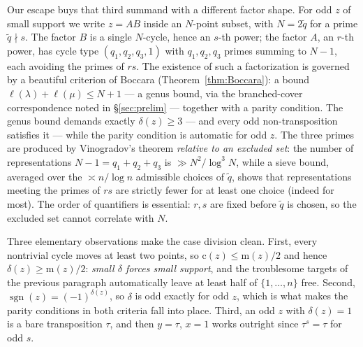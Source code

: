 \documentclass[11pt]{amsart}
\numberwithin{equation}{section}
\theoremstyle{remark}
\newcommand{\sgn}{\operatorname{sgn}}
\newcommand{\md}{\mathrm{m}}   %
\newcommand{\cy}{\mathrm{c}}   %
\begin{document}
Our escape buys that third summand with a different factor shape. For odd $z$ of
small support we write $z=AB$ inside an $N$-point subset, with $N=2\tilde q$ for
a prime $\tilde q\nmid s$. The factor $B$ is a single $N$-cycle, hence an
$s$-th power; the factor $A$, an $r$-th power, has cycle type $(q_1,q_2,q_3,1)$
with $q_1,q_2,q_3$ primes summing to $N-1$, each avoiding the primes of $rs$.
The existence of such a factorization is governed by a beautiful criterion of
Boccara (Theorem~\ref{thm:Boccara}): a bound
$\ell(\lambda)+\ell(\mu)\le N+1$ --- a genus bound, via the branched-cover
correspondence noted in \S\ref{sec:prelim} --- together with a parity condition. The genus bound
demands exactly $\delta(z)\ge 3$ --- and every odd non-transposition satisfies it
--- while the parity condition is automatic for odd $z$. The three primes are
produced by Vinogradov's theorem \emph{relative to an excluded set}: the number of
representations $N-1=q_1+q_2+q_3$ is $\gg N^2/\log^3N$, while a sieve bound,
averaged over the $\asymp n/\log n$ admissible choices of $\tilde q$, shows that
representations meeting the primes of $rs$ are strictly fewer for at least one
choice (indeed for most). The order of quantifiers is essential: $r,s$ are fixed
before $\tilde q$ is chosen, so the excluded set cannot correlate with $N$.

Three elementary observations make the case division clean. First, every
nontrivial cycle
moves at least two points, so $\cy(z)\le \md(z)/2$ and hence
$\delta(z)\ge \md(z)/2$: \emph{small $\delta$ forces small support}, and the
troublesome targets of the previous paragraph automatically leave at least half of
$\{1,\dots,n\}$ free. Second, $\sgn(z)=(-1)^{\delta(z)}$, so $\delta$ is odd
exactly for odd $z$, which is what makes the parity conditions in both criteria
fall into place. Third, an odd $z$ with $\delta(z)=1$ is a bare transposition
$\tau$, and then $y=\tau$, $x=1$ works outright since $\tau^s=\tau$ for odd $s$.
\end{document}
